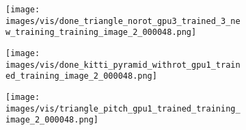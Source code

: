 \documentclass[10pt,twocolumn,letterpaper]{article}
\begin{document}
\begin{figure}[ht]
  \centering
    \begin{subfigure}[b]{0.16\textwidth}
  \texttt{[image: images/vis/done\_triangle\_norot\_gpu3\_trained\_3\_new\_training\_training\_image\_2\_000048.png]}
    \end{subfigure}%
    \begin{subfigure}[b]{0.16\textwidth}
  \texttt{[image: images/vis/done\_kitti\_pyramid\_withrot\_gpu1\_trained\_training\_image\_2\_000048.png]}
    \end{subfigure}%
    \begin{subfigure}[b]{0.16\textwidth}
  \texttt{[image: images/vis/triangle\_pitch\_gpu1\_trained\_training\_image\_2\_000048.png]}
    \end{subfigure}%


\end{figure}
\end{document}
